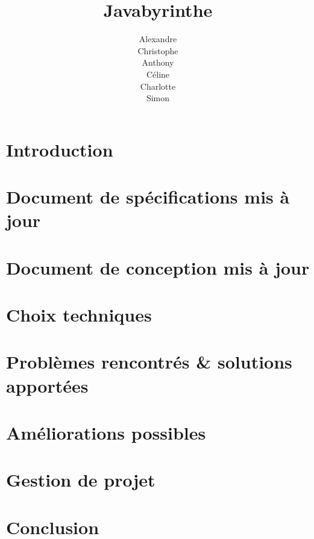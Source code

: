 \documentclass{scrreprt}
\title{Javabyrinthe}
\author{Alexandre \bsc{Brehmer}\\ Christophe \bsc{Cluizel} \\ Anthony \bsc{Courtin} \\ Céline \bsc{Leduc} \\ Charlotte \bsc{Touchard} \\ Simon \bsc{Wallon}}
\begin{document}

\tableofcontents

\chapter{Introduction}
	

\chapter{Document de spécifications mis à jour}
	

\chapter{Document de conception mis à jour}
	

\chapter{Choix techniques}
	

\chapter{Problèmes rencontrés \& solutions apportées}
  

\chapter{Améliorations possibles}
	

\chapter{Gestion de projet}
	

\chapter{Conclusion}

\end{document}
